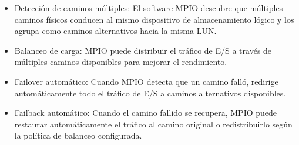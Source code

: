 \begin{itemize}
	\item Detección de caminos múltiples: El software MPIO descubre que múltiples caminos físicos conducen al mismo dispositivo de almacenamiento lógico y los agrupa como caminos alternativos hacia la misma LUN.
	\item Balanceo de carga: MPIO puede distribuir el tráfico de E/S a través de múltiples caminos disponibles para mejorar el rendimiento.
	\item Failover automático: Cuando MPIO detecta que un camino falló, redirige automáticamente todo el tráfico de E/S a caminos alternativos disponibles.
	\item Failback automático: Cuando el camino fallido se recupera, MPIO puede restaurar automáticamente el tráfico al camino original o redistribuirlo según la política de balanceo configurada.
\end{itemize}